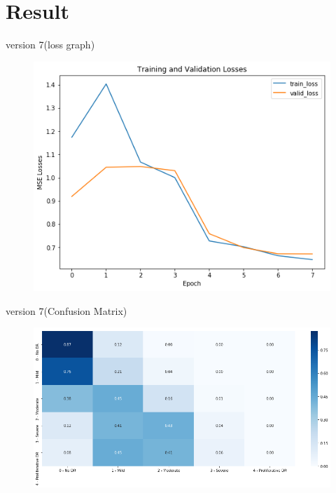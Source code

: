 \documentclass[10pt]{beamer}
\begin{document}
	\section{Result}
			\begin{frame}{version 7(loss graph)}
				\begin{figure}
					\includegraphics[scale=.5]{Results/v38lossgraph}
				\end{figure}
			\end{frame}
			\begin{frame}{version 7(Confusion Matrix)}
				\begin{figure}
					\includegraphics[width=\linewidth]{Results/v38confusion}
				\end{figure}
			\end{frame}
\end{document}
